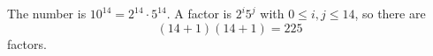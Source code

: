 The number is $10^{14}=2^{14}\cdot5^{14}$. A factor is $2^i5^j$ with $0\le i,j\le14$, so there are
\[
(14+1)(14+1)=\boxed{225}
\]
factors.
